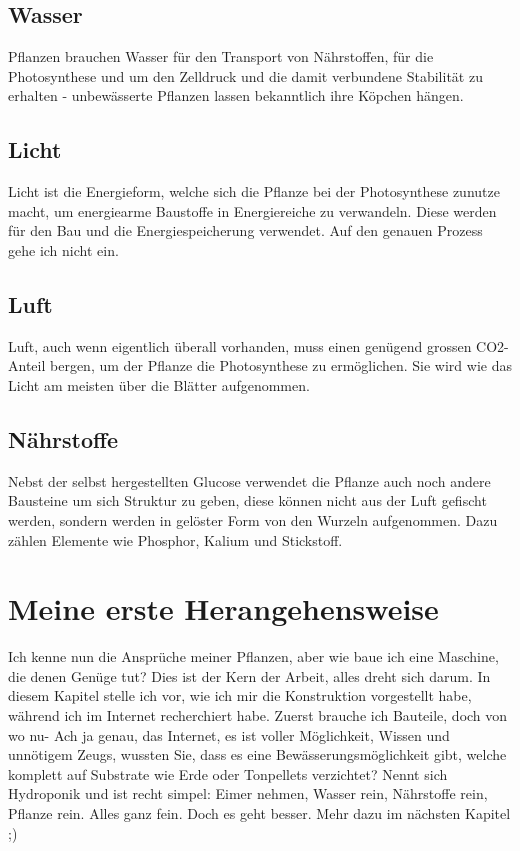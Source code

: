 \documentclass[12pt,titlepage,a4paper]{article}
\begin{document}
\subsection{Wasser}
Pflanzen brauchen Wasser für den Transport von Nährstoffen, für die Photosynthese und um den Zelldruck und die damit verbundene Stabilität zu erhalten - unbewässerte Pflanzen lassen bekanntlich ihre Köpchen hängen.


\subsection{Licht}
Licht ist die Energieform, welche sich die Pflanze bei der Photosynthese zunutze macht, um energiearme Baustoffe in Energiereiche zu verwandeln. Diese werden für den Bau und die Energiespeicherung verwendet. Auf den genauen Prozess gehe ich  nicht ein.

\subsection{Luft}
Luft, auch wenn eigentlich überall vorhanden, muss einen genügend grossen CO2-Anteil bergen, um der Pflanze die Photosynthese zu ermöglichen. Sie wird wie das Licht am meisten über die Blätter aufgenommen.

\subsection{Nährstoffe}
Nebst der selbst hergestellten Glucose verwendet die Pflanze auch noch andere Bausteine um sich Struktur zu geben, diese können nicht aus der Luft gefischt werden, sondern werden in gelöster Form von den Wurzeln aufgenommen. Dazu zählen Elemente wie Phosphor, Kalium und Stickstoff.
\newpage






\section{Meine erste Herangehensweise}
Ich kenne nun die Ansprüche meiner Pflanzen, aber wie baue ich eine Maschine, die denen Genüge tut? Dies ist der Kern der Arbeit, alles dreht sich darum. In diesem Kapitel stelle ich vor, wie ich mir die Konstruktion vorgestellt habe, während ich im Internet recherchiert habe. Zuerst brauche ich Bauteile, doch von wo nu- Ach ja genau, das Internet, es ist voller Möglichkeit, Wissen und unnötigem Zeugs, wussten Sie, dass es eine Bewässerungsmöglichkeit gibt, welche komplett auf Substrate wie Erde oder Tonpellets verzichtet? Nennt sich Hydroponik und ist recht simpel: Eimer nehmen, Wasser rein, Nährstoffe rein, Pflanze rein. Alles ganz fein. Doch es geht besser. Mehr dazu im nächsten Kapitel ;)
\end{document}
